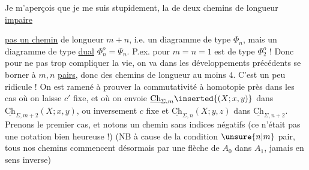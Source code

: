 Je m'aperçois  que je me suis  stupidement, la   de deux chemins de longueur \uline{impaire}  \uline{}

\uline{pas un chemin} de longueur $m+n$, i.e. un diagramme de type $\Phi_n$, mais un diagramme de type \uline{dual} $\Phi_n^o=\Psi_n$. P.ex. pour $m=n=1$
est de type $\Phi_2^o$ ! Donc pour ne pas trop compliquer la vie, on va dans les développements précédents se borner à $m,n$ \uline{pairs}, donc des chemins de longueur au moins $4$. C'est un peu ridicule ! On est ramené à prouver la commutativité à homotopie près dans les cas où on laisse $c'$  fixe, et où on envoie $\underline{\mathrm{Ch}}_{\Sigma,m}\inserted{(X;x,y)}$ dans $\underline{\mathrm{Ch}}_{\Sigma,m+2}(X;x,y)$, ou inversement $c$ fixe et $\underline{\mathrm{Ch}}_{\Sigma,n}(X;y,z)$ dans $\underline{\mathrm{Ch}}_{\Sigma,n+2}$. Prenons le premier cas, et notons un chemin  sans indices négatifs (ce n'était pas une notation bien heureuse !)
(NB  à cause de la condition $\unsure{n|m}$ pair, tous nos chemins commencent désormais par une flèche de $A_0$ dans $A_1$, jamais en sens inverse) 

